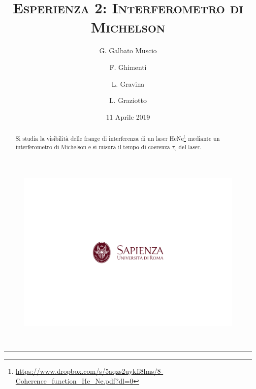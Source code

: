 \documentclass[10pt,oneside,a4paper]{article}
\title{\textsc{\textbf{Esperienza 2}: Interferometro di Michelson}}
\author{\small{G. Galbato Muscio} \and \small{F. Ghimenti} \and \small{L. Gravina} \and \small{L. Graziotto}}
\date{11 Aprile 2019}
\begin{document}
	\begin{figure}
		\centering
		\includegraphics[scale=0.5, trim={2.8cm 8.9cm 0 9cm}, clip]{logo.png}
	\end{figure}
	\maketitle
	\begin{center} 
		 \\
	\end{center}
\hrule
\vfill
\renewcommand{\abstractname}{Abstract}
\begin{abstract}
Si studia la visibilità delle frange di interferenza di un laser HeNe\footnote{\url{https://www.dropbox.com/s/5aqzs2uykfi8lms/8-Coherence_function_He_Ne.pdf?dl=0}} mediante un interferometro di Michelson e si misura il tempo di coerenza $\tau_\mathrm{c}$ del laser.
\end{abstract}
\vfill
\tableofcontents %
\newpage


\pagebreak
\end{document}
